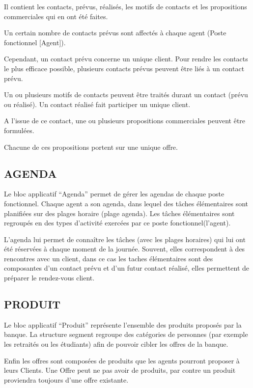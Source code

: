 Il contient les contacts, prévus, réalisés, les motifs de contacts et les propositions commerciales qui en ont été faites.

Un certain nombre de contacts prévus sont affectés à chaque agent (Poste fonctionnel [Agent]).

Cependant, un contact prévu concerne un unique client. Pour rendre les contacts le plus efficace possible, plusieurs contacts prévus peuvent être liés à un contact prévu.

Un ou plusieurs motifs de contacts peuvent être traités durant un contact (prévu ou réalisé). Un contact réalisé fait participer un unique client.

A l’issue de ce contact, une ou plusieurs propositions commerciales peuvent être formulées.

Chacune de ces propositions portent sur une unique offre.

       \subsection{AGENDA}

Le bloc applicatif “Agenda” permet de gérer les agendas de chaque poste fonctionnel. Chaque agent a son agenda, dans lequel des tâches élémentaires sont planifiées sur des plages horaire (plage agenda). Les tâches élémentaires sont regroupés en des types d'activité exercées par ce poste fonctionnel(l'agent).

L'agenda lui permet de connaître les tâches (avec les plages horaires) qui lui ont été réservées à chaque moment de la journée. Souvent, elles correspondent à des rencontres avec un client, dans ce cas les taches élémentaires sont des composantes d’un contact prévu et d’un futur contact réalisé, elles permettent de préparer le rendez-vous client.

       \subsection{PRODUIT}

Le bloc applicatif “Produit” représente l'ensemble des produits proposés par la banque. La structure segment regroupe des catégories de personnes (par exemple les retraités ou les étudiants) afin de pouvoir cibler les offres de la banque.

Enfin les offres sont composées de produits que les agents pourront proposer à leurs Clients. Une Offre peut ne pas avoir de produits, par contre un produit proviendra toujours d'une offre existante.

